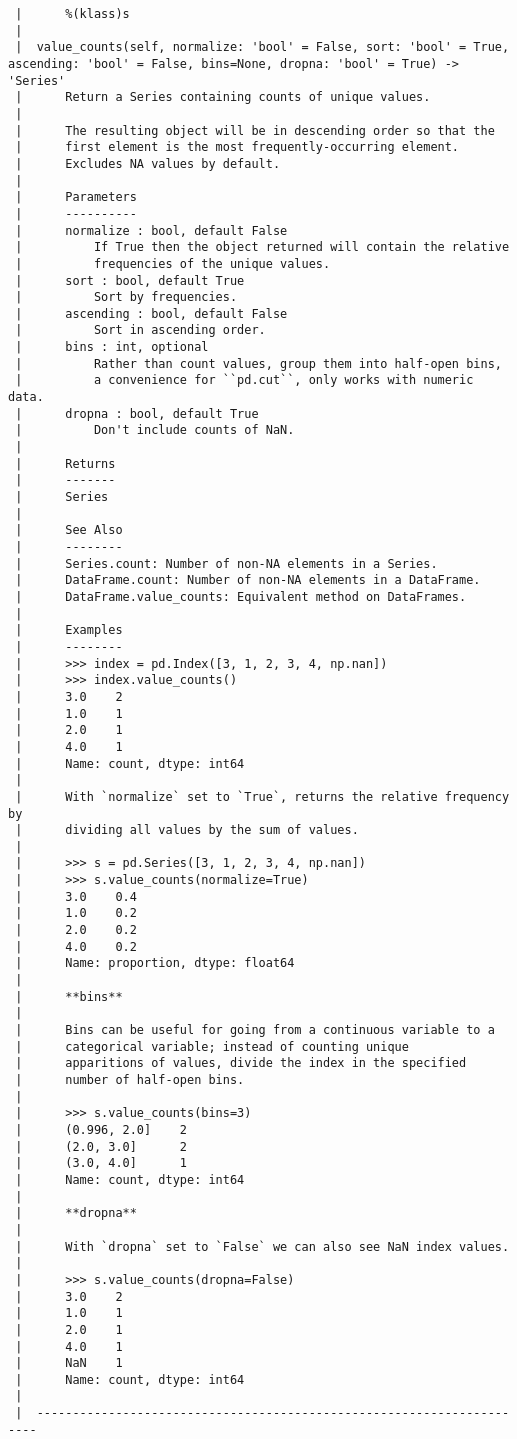 \documentclass[
  letterpaper,
  DIV=11,
  numbers=noendperiod]{scrreprt}
\begin{document}
\begin{verbatim}
 |      %(klass)s
 |  
 |  value_counts(self, normalize: 'bool' = False, sort: 'bool' = True, ascending: 'bool' = False, bins=None, dropna: 'bool' = True) -> 'Series'
 |      Return a Series containing counts of unique values.
 |      
 |      The resulting object will be in descending order so that the
 |      first element is the most frequently-occurring element.
 |      Excludes NA values by default.
 |      
 |      Parameters
 |      ----------
 |      normalize : bool, default False
 |          If True then the object returned will contain the relative
 |          frequencies of the unique values.
 |      sort : bool, default True
 |          Sort by frequencies.
 |      ascending : bool, default False
 |          Sort in ascending order.
 |      bins : int, optional
 |          Rather than count values, group them into half-open bins,
 |          a convenience for ``pd.cut``, only works with numeric data.
 |      dropna : bool, default True
 |          Don't include counts of NaN.
 |      
 |      Returns
 |      -------
 |      Series
 |      
 |      See Also
 |      --------
 |      Series.count: Number of non-NA elements in a Series.
 |      DataFrame.count: Number of non-NA elements in a DataFrame.
 |      DataFrame.value_counts: Equivalent method on DataFrames.
 |      
 |      Examples
 |      --------
 |      >>> index = pd.Index([3, 1, 2, 3, 4, np.nan])
 |      >>> index.value_counts()
 |      3.0    2
 |      1.0    1
 |      2.0    1
 |      4.0    1
 |      Name: count, dtype: int64
 |      
 |      With `normalize` set to `True`, returns the relative frequency by
 |      dividing all values by the sum of values.
 |      
 |      >>> s = pd.Series([3, 1, 2, 3, 4, np.nan])
 |      >>> s.value_counts(normalize=True)
 |      3.0    0.4
 |      1.0    0.2
 |      2.0    0.2
 |      4.0    0.2
 |      Name: proportion, dtype: float64
 |      
 |      **bins**
 |      
 |      Bins can be useful for going from a continuous variable to a
 |      categorical variable; instead of counting unique
 |      apparitions of values, divide the index in the specified
 |      number of half-open bins.
 |      
 |      >>> s.value_counts(bins=3)
 |      (0.996, 2.0]    2
 |      (2.0, 3.0]      2
 |      (3.0, 4.0]      1
 |      Name: count, dtype: int64
 |      
 |      **dropna**
 |      
 |      With `dropna` set to `False` we can also see NaN index values.
 |      
 |      >>> s.value_counts(dropna=False)
 |      3.0    2
 |      1.0    1
 |      2.0    1
 |      4.0    1
 |      NaN    1
 |      Name: count, dtype: int64
 |  
 |  ----------------------------------------------------------------------

\end{verbatim}
\end{document}
